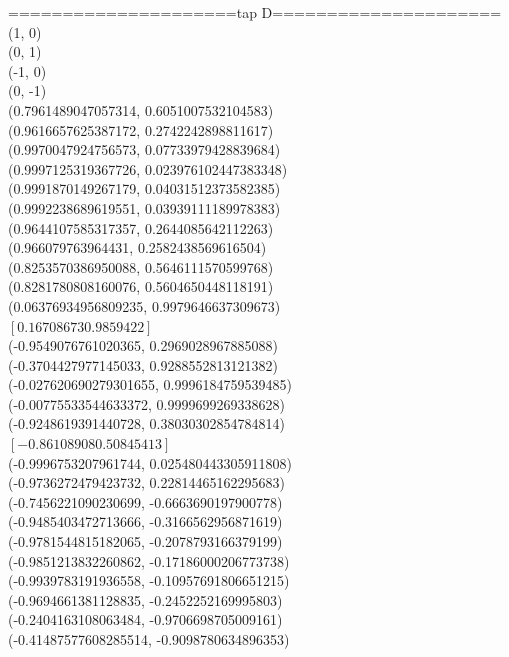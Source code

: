 \documentclass[12pt,a4paper,openany,oneside]{report}
\begin{document}
=====================tap D=====================\\
(1, 0)\\
(0, 1)\\
(-1, 0)\\
(0, -1)\\
(0.7961489047057314, 0.6051007532104583)\\
(0.9616657625387172, 0.2742242898811617)\\
(0.9970047924756573, 0.07733979428839684)\\
(0.9997125319367726, 0.023976102447383348)\\
(0.9991870149267179, 0.04031512373582385)\\
(0.9992238689619551, 0.03939111189978383)\\
(0.9644107585317357, 0.2644085642112263)\\
(0.966079763964431, 0.2582438569616504)\\
(0.8253570386950088, 0.5646111570599768)\\
(0.8281780808160076, 0.5604650448118191)\\
(0.06376934956809235, 0.9979646637309673)\\
$[0.16708673 0.9859422]$\\
(-0.9549076761020365, 0.2969028967885088)\\
(-0.3704427977145033, 0.9288552813121382)\\
(-0.027620690279301655, 0.9996184759539485)\\
(-0.00775533544633372, 0.9999699269338628)\\
(-0.9248619391440728, 0.38030302854784814)\\
$[-0.86108908  0.50845413]$\\
(-0.9996753207961744, 0.025480443305911808)\\
(-0.9736272479423732, 0.22814465162295683)\\
(-0.7456221090230699, -0.6663690197900778)\\
(-0.9485403472713666, -0.3166562956871619)\\
(-0.9781544815182065, -0.2078793166379199)\\
(-0.9851213832260862, -0.17186000206773738)\\
(-0.9939783191936558, -0.10957691806651215)\\
(-0.9694661381128835, -0.2452252169995803)\\
(-0.2404163108063484, -0.9706698705009161)\\
(-0.41487577608285514, -0.9098780634896353)\\
\end{document}
